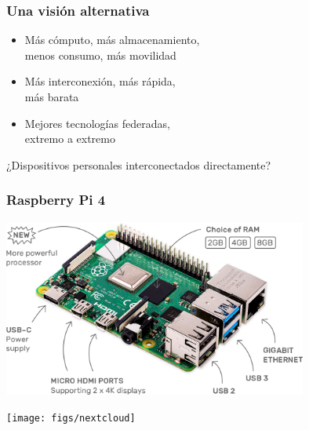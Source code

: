 \documentclass[17pt,aspectratio=169,hyperref=pdfusetitle]{beamer}
\begin{document}

\begin{frame}
\frametitle{Una visión alternativa}

\begin{itemize}
\item Más cómputo, más almacenamiento, \\
  menos consumo, más movilidad \\
\item Más interconexión, más rápida, \\
  más barata \\
\item Mejores tecnologías federadas, \\
  extremo a extremo \\
\end{itemize}

  \begin{flushright}
  ¿Dispositivos personales
  interconectados directamente? \\
  \end{flushright}

\end{frame}

\begin{frame}[fragile]
  \frametitle{Raspberry Pi 4}

  \begin{center}
  \includegraphics[width=10cm]{figs/raspberry-pi}
  \end{center}


\end{frame}


\begin{frame}[fragile]

  \begin{center}
  \texttt{[image: figs/nextcloud]}
  \end{center}
  
\end{frame}
\end{document}
